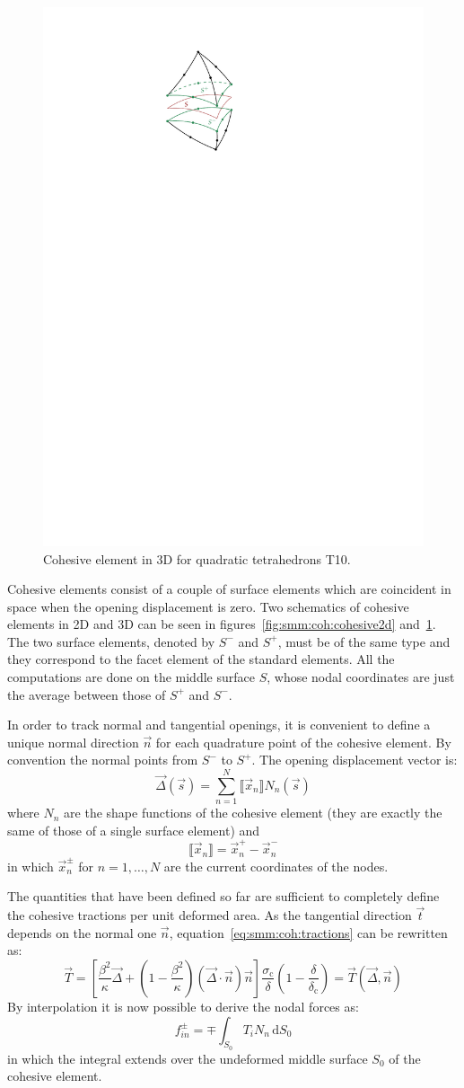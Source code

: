 \begin{figure}
  \centering
  \includegraphics[width=.25\textwidth]{figures/cohesive3d}
  \caption{Cohesive element in 3D for quadratic tetrahedrons T10.}
  \label{fig:smm:coh:cohesive3d}
\end{figure}

Cohesive elements consist of a couple of surface elements which are
coincident in space when the opening displacement is zero. Two
schematics of cohesive elements in 2D and 3D can be seen in
figures~\ref{fig:smm:coh:cohesive2d}
and~\ref{fig:smm:coh:cohesive3d}. The two surface elements, denoted by
$S^-$ and $S^+$, must be of the same type and they correspond to the
facet element of the standard elements. All the computations are done
on the middle surface $S$, whose nodal coordinates are just the
average between those of $S^+$ and $S^-$.

In order to track normal and tangential openings, it is convenient to
define a unique normal direction $\vec{n}$ for each quadrature point
of the cohesive element. By convention the normal points from $S^-$ to
$S^+$. The opening displacement vector is:
\begin{equation}
  \label{eq:opening_displacement}
  \vec{\Delta} (\vec{s}) = \sum_{n=1}^N \llbracket \vec{x}_n \rrbracket N_n (\vec s)
\end{equation}
where $N_n$ are the shape functions of the cohesive element (they are
exactly the same of those of a single surface element) and
\begin{equation}
  \label{eq:disp_difference}
  \llbracket \vec{x}_n \rrbracket = \vec{x}_n^+ - \vec{x}_n^-
\end{equation}
in which $\vec{x}_n^\pm$ for $n=1,\dots,N$ are the current coordinates
of the nodes.

The quantities that have been defined so far are sufficient to
completely define the cohesive tractions per unit deformed
area. As the tangential direction $\vec{t}$ depends on the normal one
$\vec{n}$, equation~\eqref{eq:smm:coh:tractions} can be rewritten as:
\begin{equation}
  \vec{T} = \left[ \frac{\beta^2}{\kappa} \vec{\Delta} +
    \left( 1- \frac{\beta^2}{\kappa}\right)
    \left( \vec{\Delta} \cdot \vec{n}\right) \vec{n} \right]
  \frac{\sigma_\mathrm{c}}{\delta}
  \left( 1- \frac{\delta}{\delta_\mathrm{c}} \right) =
  \vec{T}(\vec{\Delta}, \vec{n})
\end{equation}
 By interpolation it is now possible to derive the nodal
forces as:
\begin{equation}
  f_{in}^\pm = \mp \int_{S_0} T_i N_n\, \mathrm{d}S_0
\end{equation}
in which the integral extends over the undeformed middle surface $S_0$
of the cohesive element.

